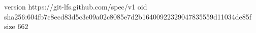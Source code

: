 version https://git-lfs.github.com/spec/v1
oid sha256:604fb7c8ecd83d5c3e09a02c8085e7d2b16400922329047835559d11034de85f
size 662
